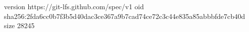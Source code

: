 version https://git-lfs.github.com/spec/v1
oid sha256:2fda6cc0b7f3b5d40dac3ce367a9b7cad74ce72c3c44e835a85abbbfde7cb40d
size 28245
